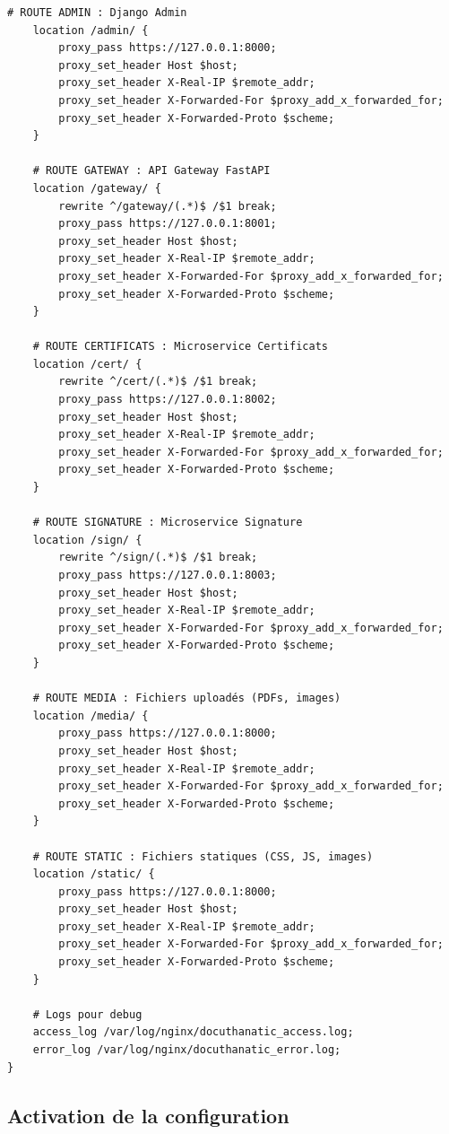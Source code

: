 \documentclass[12pt,a4paper]{article}
\begin{document}
\begin{lstlisting}[style=nginx, caption={Configuration Nginx pour Doc@uthANTIC}, label={lst:nginx_config}]
    # ROUTE ADMIN : Django Admin
    location /admin/ {
        proxy_pass https://127.0.0.1:8000;
        proxy_set_header Host $host;
        proxy_set_header X-Real-IP $remote_addr;
        proxy_set_header X-Forwarded-For $proxy_add_x_forwarded_for;
        proxy_set_header X-Forwarded-Proto $scheme;
    }
    
    # ROUTE GATEWAY : API Gateway FastAPI
    location /gateway/ {
        rewrite ^/gateway/(.*)$ /$1 break;
        proxy_pass https://127.0.0.1:8001;
        proxy_set_header Host $host;
        proxy_set_header X-Real-IP $remote_addr;
        proxy_set_header X-Forwarded-For $proxy_add_x_forwarded_for;
        proxy_set_header X-Forwarded-Proto $scheme;
    }
    
    # ROUTE CERTIFICATS : Microservice Certificats
    location /cert/ {
        rewrite ^/cert/(.*)$ /$1 break;
        proxy_pass https://127.0.0.1:8002;
        proxy_set_header Host $host;
        proxy_set_header X-Real-IP $remote_addr;
        proxy_set_header X-Forwarded-For $proxy_add_x_forwarded_for;
        proxy_set_header X-Forwarded-Proto $scheme;
    }
    
    # ROUTE SIGNATURE : Microservice Signature
    location /sign/ {
        rewrite ^/sign/(.*)$ /$1 break;
        proxy_pass https://127.0.0.1:8003;
        proxy_set_header Host $host;
        proxy_set_header X-Real-IP $remote_addr;
        proxy_set_header X-Forwarded-For $proxy_add_x_forwarded_for;
        proxy_set_header X-Forwarded-Proto $scheme;
    }
    
    # ROUTE MEDIA : Fichiers uploadés (PDFs, images)
    location /media/ {
        proxy_pass https://127.0.0.1:8000;
        proxy_set_header Host $host;
        proxy_set_header X-Real-IP $remote_addr;
        proxy_set_header X-Forwarded-For $proxy_add_x_forwarded_for;
        proxy_set_header X-Forwarded-Proto $scheme;
    }
    
    # ROUTE STATIC : Fichiers statiques (CSS, JS, images)
    location /static/ {
        proxy_pass https://127.0.0.1:8000;
        proxy_set_header Host $host;
        proxy_set_header X-Real-IP $remote_addr;
        proxy_set_header X-Forwarded-For $proxy_add_x_forwarded_for;
        proxy_set_header X-Forwarded-Proto $scheme;
    }
    
    # Logs pour debug
    access_log /var/log/nginx/docuthanatic_access.log;
    error_log /var/log/nginx/docuthanatic_error.log;
}
\end{lstlisting}

\subsection{Activation de la configuration}
\end{document}
